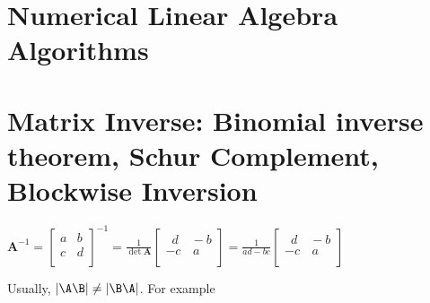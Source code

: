 \section{Numerical Linear Algebra Algorithms}
\section{Matrix Inverse: Binomial inverse theorem, Schur Complement, Blockwise Inversion}
\begin{rmk}
	$\mathbf{A}^{-1} = \begin{bmatrix}
a & b \\ c & d \\
\end{bmatrix}^{-1} =
\frac{1}{\det{\mathbf{A}}} \begin{bmatrix}
\,\,\,d & \!\!-b \\ -c & \,a \\
\end{bmatrix} =
\frac{1}{ad - bc} \begin{bmatrix}
\,\,\,d & \!\!-b \\ -c & \,a \\
\end{bmatrix}$
\end{rmk}

Usually, $|\A\B| \ne |\B\A|$. For example


